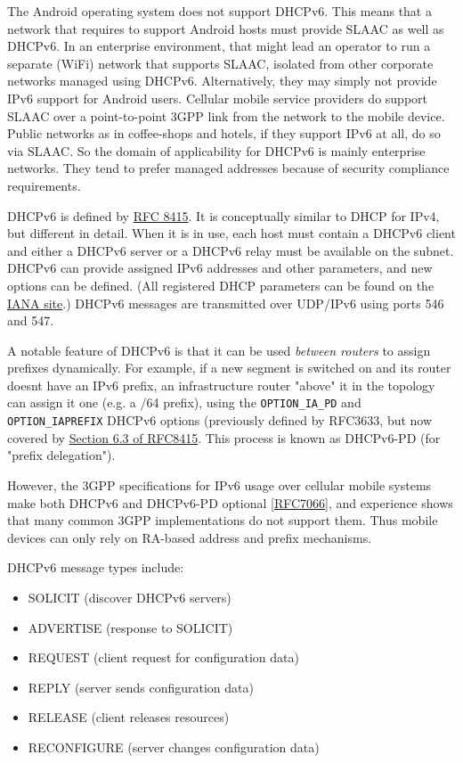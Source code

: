 \documentclass[
]{article}
\providecommand{\tightlist}{%
  \setlength{\itemsep}{0pt}\setlength{\parskip}{0pt}}
\begin{document}
The Android operating system does not support DHCPv6. This means that a
network that requires to support Android hosts must provide SLAAC as
well as DHCPv6. In an enterprise environment, that might lead an
operator to run a separate (WiFi) network that supports SLAAC, isolated
from other corporate networks managed using DHCPv6. Alternatively, they
may simply not provide IPv6 support for Android users. Cellular mobile
service providers do support SLAAC over a point-to-point 3GPP link from
the network to the mobile device. Public networks as in coffee-shops and
hotels, if they support IPv6 at all, do so via SLAAC. So the domain of
applicability for DHCPv6 is mainly enterprise networks. They tend to
prefer managed addresses because of security compliance requirements.

DHCPv6 is defined by \href{https://www.rfc-editor.org/info/rfc8415}{RFC
8415}. It is conceptually similar to DHCP for IPv4, but different in
detail. When it is in use, each host must contain a DHCPv6 client and
either a DHCPv6 server or a DHCPv6 relay must be available on the
subnet. DHCPv6 can provide assigned IPv6 addresses and other parameters,
and new options can be defined. (All registered DHCP parameters can be
found on the
\href{https://www.iana.org/assignments/dhcpv6-parameters/dhcpv6-parameters.xhtml\#dhcpv6-parameters-2}{IANA
site}.) DHCPv6 messages are transmitted over UDP/IPv6 using ports 546
and 547.

A notable feature of DHCPv6 is that it can be used \emph{between
routers} to assign prefixes dynamically. For example, if a new segment
is switched on and its router doesn\textquotesingle t have an IPv6
prefix, an infrastructure router "above" it in the topology can assign
it one (e.g. a /64 prefix), using the \texttt{OPTION\_IA\_PD} and
\texttt{OPTION\_IAPREFIX} DHCPv6 options (previously defined by RFC3633,
but now covered by
\href{https://www.rfc-editor.org/rfc/rfc8415.html\#section-6.3}{Section
6.3 of RFC8415}. This process is known as DHCPv6-PD (for "prefix
delegation").

However, the 3GPP specifications for IPv6 usage over cellular mobile
systems make both DHCPv6 and DHCPv6-PD optional
{[}\href{https://www.rfc-editor.org/info/rfc7066}{RFC7066}{]}, and
experience shows that many common 3GPP implementations do not support
them. Thus mobile devices can only rely on RA-based address and prefix
mechanisms.

DHCPv6 message types include:

\begin{itemize}
\tightlist
\item
  SOLICIT (discover DHCPv6 servers)
\item
  ADVERTISE (response to SOLICIT)
\item
  REQUEST (client request for configuration data)
\item
  REPLY (server sends configuration data)
\item
  RELEASE (client releases resources)
\item
  RECONFIGURE (server changes configuration data)
\end{itemize}
\end{document}

